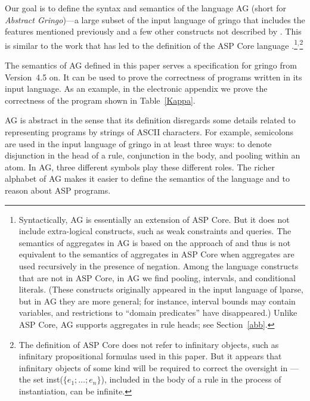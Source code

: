 \documentclass{tlp}
\begin{document}
Our goal is to define the syntax and semantics of the language AG
(short for {\sl Abstract Gringo\/})---a large subset of the input language
of {\sc gringo} that includes the features mentioned previously
and a few other constructs not described by  \citeyear{har14a}.
This is
similar to the work that has led to the definition of the ASP
Core language \cite{aspcore2}.\footnote{Syntactically, AG is essentially
an extension of ASP Core.  But it does not include extra-logical
constructs, such as weak constraints and queries.  The semantics of
aggregates in AG is based on the approach of  \citeyear{fer05}
and thus is not
equivalent to the semantics of aggregates in ASP Core when aggregates
are used recursively in the presence of negation.  Among the language
constructs that are not in
ASP Core, in AG we find pooling, intervals, and conditional literals.
(These constructs originally appeared in the input language of {\sc lparse},
but in AG they are more general; for instance, interval bounds may
contain variables,
and restrictions to ``domain predicates'' have disappeared.)  Unlike
ASP Core, AG supports aggregates in rule heads; see
Section~\ref{abb}.}$^,$\footnote{The definition of ASP Core does not refer to
infinitary objects, such as infinitary propositional formulas used in this
paper.  But it appears that infinitary objects of some kind will be required
to correct the oversight in \cite[Section~2.2]{aspcore2}---the set
\hbox{inst($\{e_1;\dots;e_n\}$)}, included in the body of a rule in the
process of instantiation, can be infinite.}

The semantics of AG defined in this paper serves a specification for
{\sc gringo} from Version~4.5 on.  It can be used to prove
the correctness of programs written in its input language.
As an example, in the electronic appendix we prove the
correctness of the program shown in Table~\ref{Kappa}.

AG is abstract in the sense that its definition disregards
some details related to representing programs by strings of ASCII characters.
For example, semicolons are used in the input language of {\sc gringo} in
at least
three ways: to denote disjunction in the head of a rule, conjunction in the
body, and pooling within an atom.  In AG, three different symbols play
these different roles.  The richer alphabet of AG makes it easier to define the
semantics of the language and to reason about ASP programs.

\end{document}
